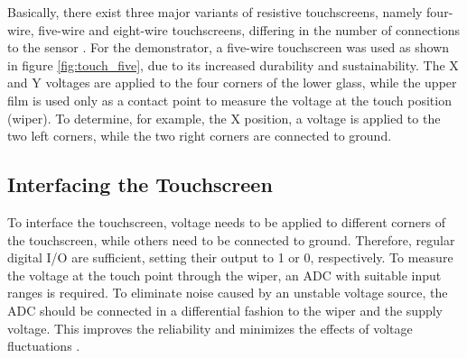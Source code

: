 Basically, there exist three major variants of resistive touchscreens, namely
four-wire, five-wire and eight-wire touchscreens, differing in the number of
connections to the sensor \citep{Wal12}. For the demonstrator, a five-wire
touchscreen was used as shown in figure \ref{fig:touch_five}, due to its
increased durability and sustainability. The X and Y voltages are applied to
the four corners of the lower glass, while the upper film is used only as a
contact point to measure the voltage at the touch position (wiper). To
determine, for example, the X position, a voltage is applied to the two left
corners, while the two right corners are connected to ground.

\subsection{Interfacing the Touchscreen}
To interface the touchscreen, voltage needs to be applied to different corners
of the touchscreen, while others need to be connected to ground. Therefore,
regular digital I/O are sufficient, setting their output to 1 or 0,
respectively. To measure the voltage at the touch point through the wiper, an
\ac{ADC} with suitable input ranges is required. To eliminate noise caused by
an unstable voltage source, the \ac{ADC} should be connected in a differential
fashion to the wiper and the supply voltage. This improves the reliability and
minimizes the effects of voltage fluctuations \citep{OOD00}.

